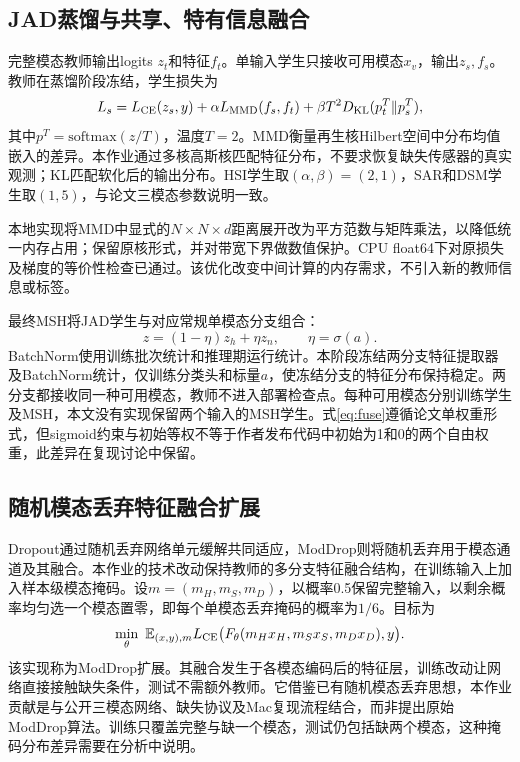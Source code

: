 \documentclass[conference,10pt]{IEEEtran}
\begin{document}
\subsection{JAD蒸馏与共享、特有信息融合}
完整模态教师输出logits $z_t$和特征$f_t$。单输入学生只接收可用模态$x_v$，输出$z_s,f_s$。教师在蒸馏阶段冻结，学生损失为
\begin{equation}
 L_s=L_{\rm CE}(z_s,y)+\alpha L_{\rm MMD}(f_s,f_t)
       +\beta T^2 D_{\rm KL}(p_t^T\Vert p_s^T),\label{eq:jad}
\end{equation}
其中$p^T=\mathrm{softmax}(z/T)$，温度$T=2$。MMD衡量再生核Hilbert空间中分布均值嵌入的差异\cite{gretton2012}。本作业通过多核高斯核匹配特征分布，不要求恢复缺失传感器的真实观测；KL匹配软化后的输出分布。HSI学生取$(\alpha,\beta)=(2,1)$，SAR和DSM学生取$(1,5)$，与论文三模态参数说明一致。

本地实现将MMD中显式的$N\times N\times d$距离展开改为平方范数与矩阵乘法，以降低统一内存占用；保留原核形式，并对带宽下界做数值保护。CPU float64下对原损失及梯度的等价性检查已通过。该优化改变中间计算的内存需求，不引入新的教师信息或标签。

最终MSH将JAD学生与对应常规单模态分支组合：
\begin{equation}
 z=(1-\eta)z_h+\eta z_n,\qquad \eta=\sigma(a).\label{eq:fuse}
\end{equation}
BatchNorm使用训练批次统计和推理期运行统计\cite{ioffe2015}。本阶段冻结两分支特征提取器及BatchNorm统计，仅训练分类头和标量$a$，使冻结分支的特征分布保持稳定。两分支都接收同一种可用模态，教师不进入部署检查点。每种可用模态分别训练学生及MSH，本文没有实现保留两个输入的MSH学生。式\eqref{eq:fuse}遵循论文单权重形式，但sigmoid约束与初始等权不等于作者发布代码中初始为1和0的两个自由权重，此差异在复现讨论中保留。

\subsection{随机模态丢弃特征融合扩展}
Dropout通过随机丢弃网络单元缓解共同适应\cite{srivastava2014}，ModDrop则将随机丢弃用于模态通道及其融合\cite{neverova2015}。本作业的技术改动保持教师的多分支特征融合结构，在训练输入上加入样本级模态掩码。设$m=(m_H,m_S,m_D)$，以概率0.5保留完整输入，以剩余概率均匀选一个模态置零，即每个单模态丢弃掩码的概率为$1/6$。目标为
\begin{equation}
 \min_\theta\ \mathbb E_{(x,y),m}
 L_{\rm CE}\big(F_\theta(m_Hx_H,m_Sx_S,m_Dx_D),y\big).\label{eq:drop}
\end{equation}
该实现称为ModDrop扩展。其融合发生于各模态编码后的特征层，训练改动让网络直接接触缺失条件，测试不需额外教师。它借鉴已有随机模态丢弃思想\cite{neverova2015}，本作业贡献是与公开三模态网络、缺失协议及Mac复现流程结合，而非提出原始ModDrop算法。训练只覆盖完整与缺一个模态，测试仍包括缺两个模态，这种掩码分布差异需要在分析中说明。
\end{document}
